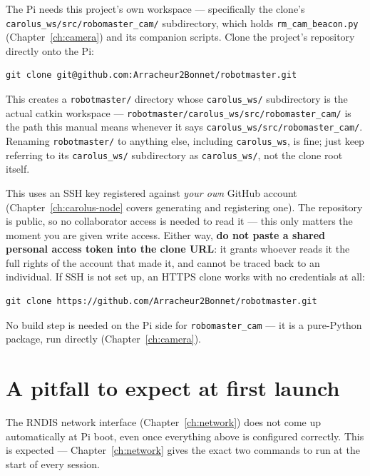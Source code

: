 \documentclass[11pt]{report}
\begin{document}
The Pi needs this project's own workspace --- specifically the clone's
\texttt{carolus\_ws/src/robomaster\_cam/} subdirectory, which holds
\texttt{rm\_cam\_beacon.py} (Chapter~\ref{ch:camera}) and its companion
scripts. Clone the project's repository directly onto the Pi:

\begin{lstlisting}[style=shell]
git clone git@github.com:Arracheur2Bonnet/robotmaster.git
\end{lstlisting}

This creates a \texttt{robotmaster/} directory whose \texttt{carolus\_ws/}
subdirectory is the actual catkin workspace ---
\texttt{robotmaster/carolus\_ws/src/robomaster\_cam/} is the path this
manual means whenever it says \texttt{carolus\_ws/src/robomaster\_cam/}.
Renaming \texttt{robotmaster/} to anything else, including
\texttt{carolus\_ws}, is fine; just keep referring to its
\texttt{carolus\_ws/} subdirectory as \texttt{carolus\_ws/}, not the clone
root itself.

This uses an SSH key registered against \emph{your own} GitHub account
(Chapter~\ref{ch:carolus-node} covers generating and registering one). The
repository is public, so no collaborator access is needed to read it ---
this only matters the moment you are given write access. Either way,
\textbf{do not paste a shared personal access token into the clone URL}: it
grants whoever reads it the full rights of the account that made it, and
cannot be traced back to an individual. If SSH is not set up, an HTTPS clone
works with no credentials at all:

\begin{lstlisting}[style=shell]
git clone https://github.com/Arracheur2Bonnet/robotmaster.git
\end{lstlisting}

No build step is needed on the Pi side for \texttt{robomaster\_cam} ---
it is a pure-Python package, run directly (Chapter~\ref{ch:camera}).

\section{A pitfall to expect at first launch}

The RNDIS network interface (Chapter~\ref{ch:network}) does not come up
automatically at Pi boot, even once everything above is configured
correctly. This is expected --- Chapter~\ref{ch:network} gives the exact
two commands to run at the start of every session.
\end{document}
